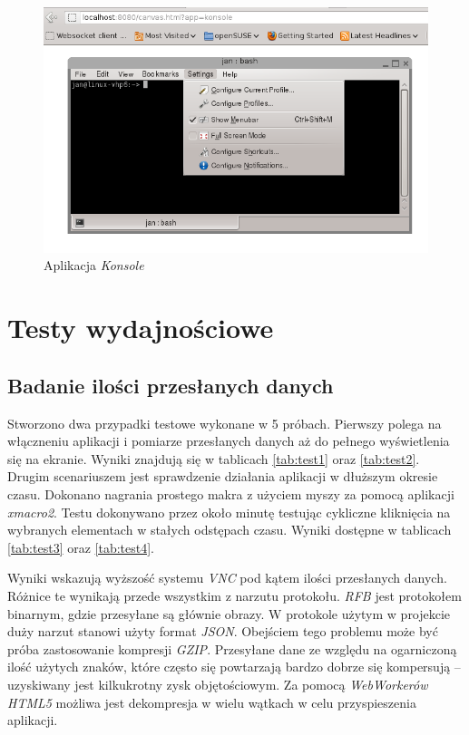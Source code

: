 \begin{figure}[H]
  \centering
  \includegraphics[width=\textwidth,height=!]{img/konsole.png}
  \caption{Aplikacja \emph{Konsole}}
  \label{konsole}
\end{figure}

\section{Testy wydajnościowe}

\subsection{Badanie ilości przesłanych danych}

Stworzono dwa przypadki testowe wykonane w 5 próbach. Pierwszy polega na włączneniu aplikacji i pomiarze przesłanych danych aż do pełnego wyświetlenia się na ekranie. Wyniki znajdują się w tablicach \ref{tab:test1} oraz \ref{tab:test2}. Drugim scenariuszem jest sprawdzenie działania aplikacji w dłuższym okresie czasu. Dokonano nagrania prostego makra z użyciem myszy za pomocą aplikacji \emph{xmacro2}. Testu dokonywano przez około minutę testując cykliczne kliknięcia na wybranych elementach w stałych odstępach czasu. Wyniki dostępne w tablicach \ref{tab:test3} oraz \ref{tab:test4}.

Wyniki wskazują wyższość systemu \emph{VNC} pod kątem ilości przesłanych danych. Różnice te wynikają przede wszystkim z narzutu protokołu. \emph{RFB} jest protokołem binarnym, gdzie przesyłane są głównie obrazy. W protokole użytym w projekcie duży narzut stanowi użyty format \emph{JSON}. Obejściem tego problemu może być próba zastosowanie kompresji \emph{GZIP}. Przesyłane dane ze względu na ogarniczoną ilość użytych znaków, które często się powtarzają bardzo dobrze się kompersują -- uzyskiwany jest kilkukrotny zysk objętościowym. Za pomocą \emph{WebWorkerów HTML5} możliwa jest dekompresja w wielu wątkach w celu przyspieszenia aplikacji.

